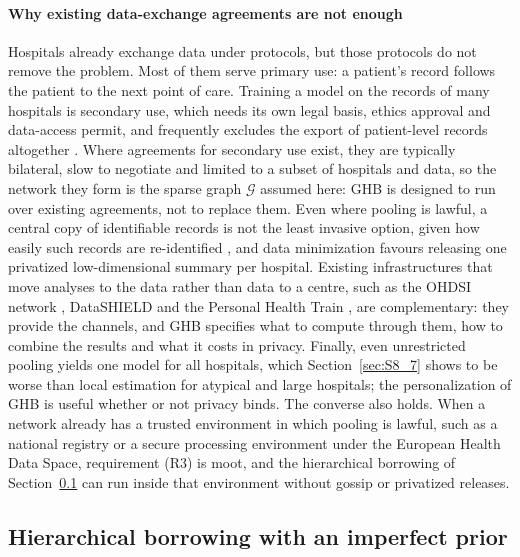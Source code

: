 \documentclass[acmsmall,screen,review]{acmart}
\theoremstyle{acmdefinition}
\begin{document}
\paragraph{Why existing data-exchange agreements are not enough} Hospitals already exchange data under protocols, but those protocols do not remove the problem. Most of them serve primary use: a patient's record follows the patient to the next point of care. Training a model on the records of many hospitals is secondary use, which needs its own legal basis, ethics approval and data-access permit, and frequently excludes the export of patient-level records altogether \cite{gdpr2016,ehds2025}. Where agreements for secondary use exist, they are typically bilateral, slow to negotiate and limited to a subset of hospitals and data, so the network they form is the sparse graph $\mathcal{G}$ assumed here: GHB is designed to run over existing agreements, not to replace them. Even where pooling is lawful, a central copy of identifiable records is not the least invasive option, given how easily such records are re-identified \cite{rocher2019estimating}, and data minimization favours releasing one privatized low-dimensional summary per hospital. Existing infrastructures that move analyses to the data rather than data to a centre, such as the OHDSI network \cite{hripcsak2015observational}, DataSHIELD \cite{gaye2014datashield} and the Personal Health Train \cite{beyan2020distributed,deist2020distributed}, are complementary: they provide the channels, and GHB specifies what to compute through them, how to combine the results and what it costs in privacy. Finally, even unrestricted pooling yields one model for all hospitals, which Section~\ref{sec:S8_7} shows to be worse than local estimation for atypical and large hospitals; the personalization of GHB is useful whether or not privacy binds. The converse also holds. When a network already has a trusted environment in which pooling is lawful, such as a national registry or a secure processing environment under the European Health Data Space, requirement (R3) is moot, and the hierarchical borrowing of Section~\ref{sec:S8_2} can run inside that environment without gossip or privatized releases.

\subsection{Hierarchical borrowing with an imperfect prior}\label{sec:S8_2}
\end{document}
